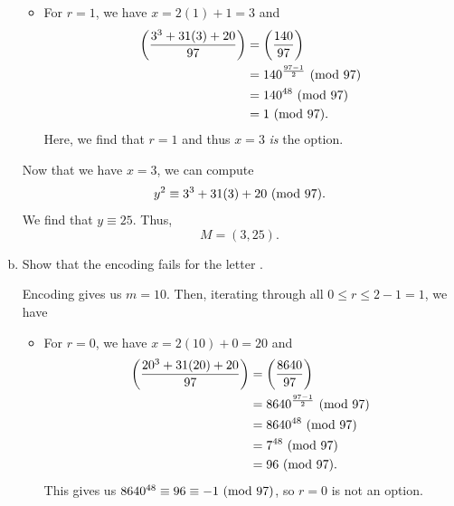 \documentclass[letterpaper]{article}
\begin{document}
\begin{mdframed}
\begin{enumerate}[(a)]
\begin{mdframed}
\begin{itemize}
                \item For $r = 1$, we have $x = 2(1) + 1 = 3$ and 
                \begin{equation*}
                    \begin{aligned}
                        \left(\frac{3^3 + 31(3) + 20}{97}\right) &= \left(\frac{140}{97}\right) \\ 
                            &= 140^{\frac{97 - 1}{2}} \ (\mathrm{mod}\ 97) \\ 
                            &= 140^{48} \ (\mathrm{mod}\ 97) \\ 
                            &= 1 \ (\mathrm{mod}\ 97).
                    \end{aligned}
                \end{equation*}
                Here, we find that $r = 1$ and thus $x = 3$ \emph{is} the option. 
            \end{itemize}
            Now that we have $x = 3$, we can compute \[y^2 \equiv 3^3 + 31(3) + 20 \ (\mathrm{mod}\ 97).\] We find that $y \equiv 25$. Thus, \[M = (3, 25).\]
        \end{mdframed}
        \item Show that the encoding fails for the letter . 
        \begin{mdframed}
            Encoding  gives us $m = 10$. Then, iterating through all $0 \leq r \leq 2 - 1 = 1$, we have 
            \begin{itemize}
                \item For $r = 0$, we have $x = 2(10) + 0 = 20$ and 
                \begin{equation*}
                    \begin{aligned}
                        \left(\frac{20^3 + 31(20) + 20}{97}\right) &= \left(\frac{8640}{97}\right) \\ 
                            &= 8640^{\frac{97 - 1}{2}} \ (\mathrm{mod}\ 97) \\ 
                            &= 8640^{48} \ (\mathrm{mod}\ 97) \\ 
                            &= 7^{48} \ (\mathrm{mod}\ 97) \\ 
                            &= 96 \ (\mathrm{mod}\ 97).
                    \end{aligned}
                \end{equation*}
                This gives us $8640^{48} \equiv 96 \equiv -1 \ (\mathrm{mod}\ 97)$, so $r = 0$ is not an option. 


\end{itemize}
\end{mdframed}
\end{enumerate}
\end{mdframed}
\end{document}
